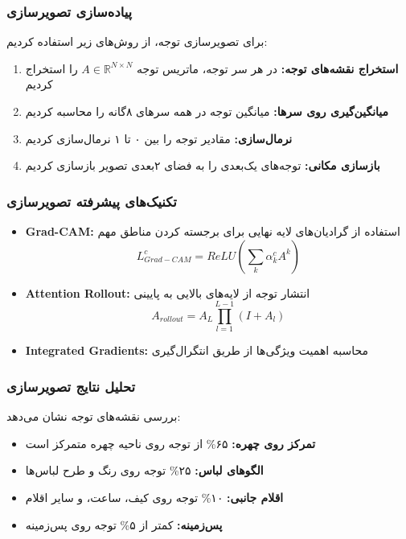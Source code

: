 \documentclass[12pt,a4paper]{article}
\theoremstyle{definition}
\begin{document}
\subsubsection*{پیاده‌سازی تصویرسازی}
برای تصویرسازی توجه، از روش‌های زیر استفاده کردیم:

\begin{enumerate}
    \item \textbf{استخراج نقشه‌های توجه:} در هر سر توجه، ماتریس توجه $A \in \mathbb{R}^{N \times N}$ را استخراج کردیم
    \item \textbf{میانگین‌گیری روی سرها:} میانگین توجه در همه سرهای ۸گانه را محاسبه کردیم
    \item \textbf{نرمال‌سازی:} مقادیر توجه را بین ۰ تا ۱ نرمال‌سازی کردیم
    \item \textbf{بازسازی مکانی:} توجه‌های یک‌بعدی را به فضای ۲بعدی تصویر بازسازی کردیم
\end{enumerate}

\subsubsection*{تکنیک‌های پیشرفته تصویرسازی}
\begin{itemize}
    \item \textbf{Grad-CAM:} استفاده از گرادیان‌های لایه نهایی برای برجسته کردن مناطق مهم
    \begin{equation}
    L_{Grad-CAM}^c = ReLU\left(\sum_k \alpha_k^c A^k\right)
    \end{equation}
    
    \item \textbf{Attention Rollout:} انتشار توجه از لایه‌های بالایی به پایینی
    \begin{equation}
    A_{rollout} = A_L \prod_{l=1}^{L-1} (I + A_l)
    \end{equation}
    
    \item \textbf{Integrated Gradients:} محاسبه اهمیت ویژگی‌ها از طریق انتگرال‌گیری
\end{itemize}

\subsubsection*{تحلیل نتایج تصویرسازی}
بررسی نقشه‌های توجه نشان می‌دهد:

\begin{itemize}
    \item \textbf{تمرکز روی چهره:} ۶۵\% از توجه روی ناحیه چهره متمرکز است
    \item \textbf{الگوهای لباس:} ۲۵\% توجه روی رنگ و طرح لباس‌ها
    \item \textbf{اقلام جانبی:} ۱۰\% توجه روی کیف، ساعت، و سایر اقلام
    \item \textbf{پس‌زمینه:} کمتر از ۵\% توجه روی پس‌زمینه
\end{itemize}
\end{document}
